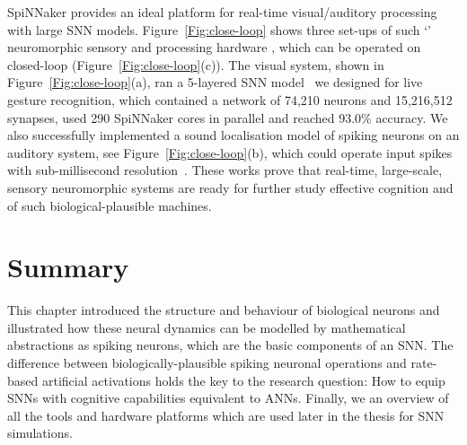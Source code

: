 SpiNNaker provides an ideal platform for real-time visual/auditory processing with large SNN models.
Figure~\ref{Fig:close-loop} shows three set-ups of such `\DIFdelbegin {}\DIFdelend \DIFaddbegin {}\DIFaddend ' neuromorphic sensory and processing hardware \DIFdelbegin {}\DIFdelend \DIFaddbegin {}\DIFaddend , which can be operated on \DIFdelbegin {}\DIFdelend \DIFaddbegin {}\DIFaddend closed-loop \DIFdelbegin {}\DIFdelend \DIFaddbegin {}\DIFaddend (Figure~\ref{Fig:close-loop}(c)).
The visual system, shown in Figure~\ref{Fig:close-loop}(a), ran a 5-layered SNN model~\citep{liu2014real} we designed for live gesture recognition, which contained a network of 74,210 neurons and 15,216,512 synapses, \DIFaddbegin {}\DIFaddend used 290 SpiNNaker cores in parallel and reached 93.0\% accuracy. 
We also successfully implemented a sound localisation model of spiking neurons on an auditory system, see Figure~\ref{Fig:close-loop}(b), which could operate \DIFaddbegin {}\DIFaddend input spikes with sub-millisecond resolution~\citep{lagorce2015breaking}.
These works prove that real-time, large-scale, sensory neuromorphic systems are ready for further study \DIFdelbegin {}\DIFdelend \DIFaddbegin {}\DIFaddend effective cognition and \DIFdelbegin {}\DIFdelend \DIFaddbegin {}\DIFaddend of such biological-plausible machines.

\section{Summary}
This chapter introduced the structure and behaviour of biological neurons and illustrated how these neural dynamics can be modelled by mathematical abstractions as spiking neurons, which are the basic components of an SNN.
The difference between biologically-plausible spiking neuronal operations and rate-based artificial activations holds the key to the research question: How to equip SNNs with cognitive capabilities equivalent to ANNs.
Finally, we \DIFdelbegin {}\DIFdelend \DIFaddbegin {}\DIFaddend an overview of all the tools and hardware platforms \DIFdelbegin \DIFdel{, }\DIFdelend which are used later in the thesis \DIFdelbegin \DIFdel{, }\DIFdelend for SNN simulations.
